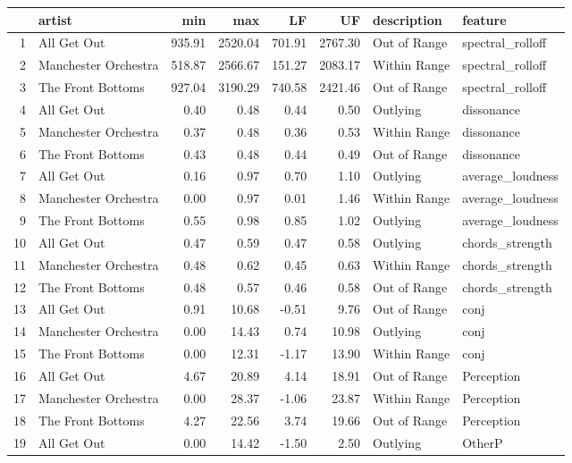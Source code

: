 \documentclass{article}\usepackage[]{graphicx}\usepackage[]{xcolor}
\begin{document}
\begin{table}[ht]
\centering
\begin{tabular}{rlrrrrll}
  \hline
 & artist & min & max & LF & UF & description & feature \\ 
  \hline
1 & All Get Out & 935.91 & 2520.04 & 701.91 & 2767.30 & Out of Range & spectral\_rolloff \\ 
  2 & Manchester Orchestra & 518.87 & 2566.67 & 151.27 & 2083.17 & Within Range & spectral\_rolloff \\ 
  3 & The Front Bottoms & 927.04 & 3190.29 & 740.58 & 2421.46 & Out of Range & spectral\_rolloff \\ 
  4 & All Get Out & 0.40 & 0.48 & 0.44 & 0.50 & Outlying & dissonance \\ 
  5 & Manchester Orchestra & 0.37 & 0.48 & 0.36 & 0.53 & Within Range & dissonance \\ 
  6 & The Front Bottoms & 0.43 & 0.48 & 0.44 & 0.49 & Out of Range & dissonance \\ 
  7 & All Get Out & 0.16 & 0.97 & 0.70 & 1.10 & Outlying & average\_loudness \\ 
  8 & Manchester Orchestra & 0.00 & 0.97 & 0.01 & 1.46 & Within Range & average\_loudness \\ 
  9 & The Front Bottoms & 0.55 & 0.98 & 0.85 & 1.02 & Outlying & average\_loudness \\ 
  10 & All Get Out & 0.47 & 0.59 & 0.47 & 0.58 & Outlying & chords\_strength \\ 
  11 & Manchester Orchestra & 0.48 & 0.62 & 0.45 & 0.63 & Within Range & chords\_strength \\ 
  12 & The Front Bottoms & 0.48 & 0.57 & 0.46 & 0.58 & Out of Range & chords\_strength \\ 
  13 & All Get Out & 0.91 & 10.68 & -0.51 & 9.76 & Out of Range & conj \\ 
  14 & Manchester Orchestra & 0.00 & 14.43 & 0.74 & 10.98 & Outlying & conj \\ 
  15 & The Front Bottoms & 0.00 & 12.31 & -1.17 & 13.90 & Within Range & conj \\ 
  16 & All Get Out & 4.67 & 20.89 & 4.14 & 18.91 & Out of Range & Perception \\ 
  17 & Manchester Orchestra & 0.00 & 28.37 & -1.06 & 23.87 & Within Range & Perception \\ 
  18 & The Front Bottoms & 4.27 & 22.56 & 3.74 & 19.66 & Out of Range & Perception \\ 
  19 & All Get Out & 0.00 & 14.42 & -1.50 & 2.50 & Outlying & OtherP \\ 

\end{tabular}
\end{table}
\end{document}
